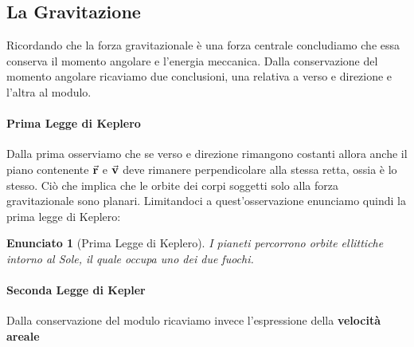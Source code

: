 \documentclass{report}
\newtheorem{enunc}[defn]{Enunciato}
\renewcommand{\v}{\va{v}}
\renewcommand{\r}{\va{r}}
\begin{document}
\subsection{La Gravitazione}
Ricordando che la forza gravitazionale è una forza centrale concludiamo che essa conserva il momento angolare e l'energia meccanica. Dalla conservazione del momento angolare ricaviamo due conclusioni, una relativa a verso e direzione e l'altra al modulo.\\
\paragraph{Prima Legge di Keplero}
Dalla prima osserviamo che se verso e direzione rimangono costanti allora anche il piano contenente $\r$ e $\v$ deve rimanere perpendicolare alla stessa retta, ossia è lo stesso. Ciò che implica che le orbite dei corpi soggetti solo alla forza gravitazionale sono planari. Limitandoci a quest'osservazione enunciamo quindi la prima legge di Keplero:
\begin{enunc}[Prima Legge di Keplero]
I pianeti percorrono orbite ellittiche intorno al Sole, il quale occupa uno dei due fuochi. 
\end{enunc}
\paragraph{Seconda Legge di Kepler}
Dalla conservazione del modulo ricaviamo invece l'espressione della \textbf{velocità areale}
\end{document}
